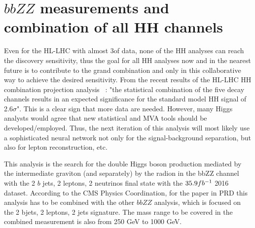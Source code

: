 %
%
%

\section{$bbZZ$ measurements and combination of all HH channels}
\label{sec:bbZZcombination}

Even for the HL-LHC with almost 3\abinv of data, none of the HH analyses can reach the discovery sensitivity, thus the goal for all HH analyses now and in the nearest future is to contribute to the grand combination and only in this collaborative way to achieve the desired sensitivity. From the recent results of the HL-LHC HH combination projection analysis ~\cite{CMS-PAS-FTR-18-019}: "the statistical combination of the five decay channels results in an expected significance for the standard model HH signal of 2.6$\sigma$". This is a clear sign that more data are needed. However, many Higgs analysts would agree that new statistical and MVA tools should be developed/employed. Thus, the next iteration of this analysis will most likely use a sophisticated neural network not only for the signal-background separation, but also for lepton reconstruction, etc. 

This analysis is the search for the double Higgs boson production mediated by the intermediate graviton (and separately) by the radion in the bbZZ channel with the 2 $b$ jets, 2 leptons, 2 neutrinos final state with the $35.9fb^{-1}$ 2016 dataset. According to the CMS Physics Coordination, for the paper in PRD this analysis has to be combined with the other $bbZZ$ analysis, which is focused on the 2 bjets, 2 leptons, 2 jets signature. %
The mass range to be covered in the combined measurement is also from 250 GeV to 1000 GeV.

